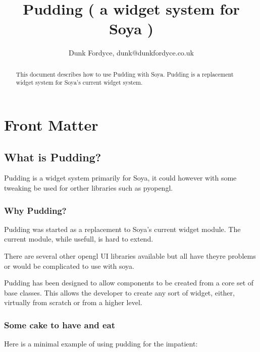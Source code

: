 \documentclass{howto}
\title{Pudding ( a widget system for Soya )}
\author{Dunk Fordyce, dunk@dunkfordyce.co.uk}
\begin{document}
\maketitle
\ifhtml
\chapter*{Front Matter\label{front}}
\fi

\begin{abstract}
\noindent
This document describes how to use Pudding with Soya. Pudding is a
replacement widget system for Soya's current widget system. 
\end{abstract}

\tableofcontents

\section{What is Pudding?}

Pudding is a widget system primarily for Soya, it could however 
with some tweaking be used for orther libraries such as pyopengl.

\subsection{Why Pudding?}

Pudding was started as a replacement to Soya's current widget module.
The current module, while usefull, is hard to extend.

There are several other opengl UI libraries available but all have
theyre problems or would be complicated to use with soya. 

Pudding has been designed to allow components to be created from a 
core set of base classes. This allows the developer to create any
sort of widget, either, virtually from scratch or from a higher level.

\subsection{Some cake to have and eat}
Here is a minimal example of using pudding for the impatient:
\end{document}
